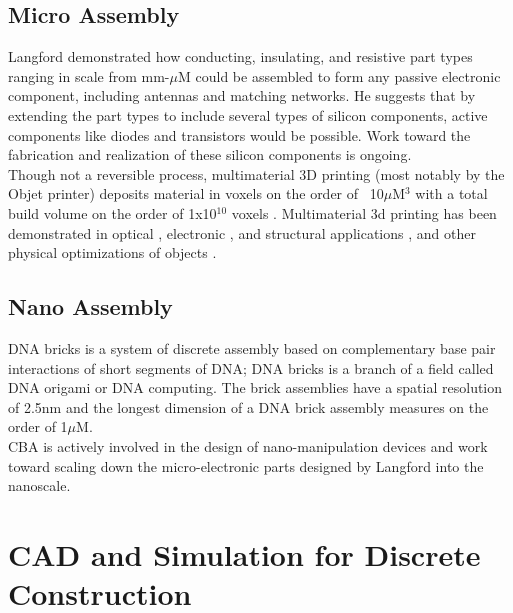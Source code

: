 {\subsection{Micro Assembly}


Langford demonstrated how conducting, insulating, and resistive part types ranging in scale from mm-$\mu$M could be assembled to form any passive electronic component, including antennas and matching networks\cite{Langford2014}.  He suggests that by extending the part types to include several types of silicon components, active components like diodes and transistors would be possible.  Work toward the fabrication and realization of these silicon components is ongoing.
\\

Though not a reversible process, multimaterial 3D printing (most notably by the Objet printer) deposits material in voxels on the order of ~10$\mu$M$^{3}$ with a total build volume on the order of 1x10$^{10}$ voxels \cite{Objet1000}.  Multimaterial 3d printing has been demonstrated in optical \cite{Willis2012}, electronic \cite{Ahn2009}, and structural applications \cite{Skouras2013} \cite{Schumacher}, and other physical optimizations of objects \cite{Bacher2014}.

\subsection{Nano Assembly}

DNA bricks is a system of discrete assembly based on complementary base pair interactions of short segments of DNA\cite{Ke2012}; DNA bricks is a branch of a field called DNA origami\cite{Rothemund2006} or DNA computing\cite{Seeman1982}\cite{Adleman1994}.  The brick assemblies have a spatial resolution of 2.5nm and the longest dimension of a DNA brick assembly measures on the order of 1$\mu$M\cite{Ke2014}.
\\

CBA is actively involved in the design of nano-manipulation devices and work toward scaling down the micro-electronic parts designed by Langford\cite{Langford2014} into the nanoscale.

\section{CAD and Simulation for Discrete Construction}

}
